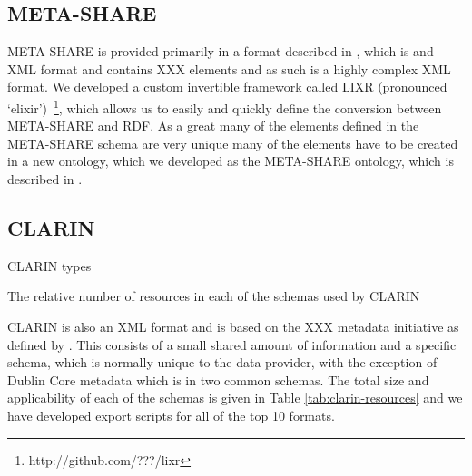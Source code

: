 \documentclass[smallextended]{svjour3}       %
\begin{document}
\begin{table}
    \caption{\label{tab:resource-sizes}The sizes of the resources in terms of
    number of metadata records and total data size}
\end{table}

\subsection{META-SHARE}

META-SHARE is provided primarily in a format described in \cite{todo}, which is
and XML format and contains XXX elements and as such is a highly complex XML
format. We developed a custom invertible framework called LIXR (pronounced
`elixir')~\footnote{http://github.com/???/lixr}, which allows us to easily and
quickly define the conversion between META-SHARE and RDF. As a great many of the
elements defined in the META-SHARE schema are very unique many of the elements
have to be created in a new ontology, which we developed as the META-SHARE
ontology, which is described in \cite{todo}. 

\subsection{CLARIN}

\begin{table}
    CLARIN types
    \caption{\label{tab:clarin-resources}The relative number of resources in
    each of the schemas used by CLARIN}
\end{table}

CLARIN is also an XML format and is based on the XXX metadata initiative as
defined by \cite{xxx}. This consists of a small shared amount of information and
a specific schema, which is normally unique to the data provider, with the
exception of Dublin Core metadata which is in two common schemas. The total size
and applicability of each of the schemas is given in Table
\ref{tab:clarin-resources} and we have developed export scripts for all of the
top 10 formats.
\end{document}
